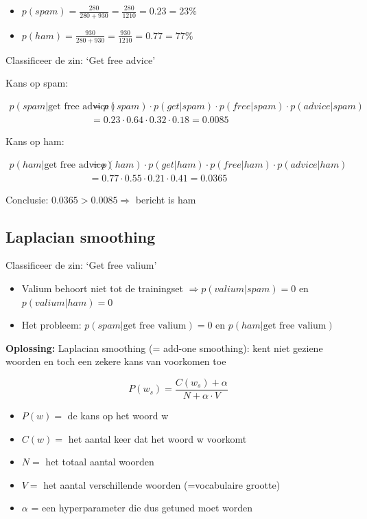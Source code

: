 \documentclass{article}
\begin{document}
\begin{itemize}
    \item $p(spam) = \frac{280}{280 + 930} = \frac{280}{1210} = 0.23 = 23\%$
    \item $p(ham) = \frac{930}{280 + 930} = \frac{930}{1210} = 0.77 = 77\%$
\end{itemize}

Classificeer de zin: `Get free advice'

Kans op spam:

\begin{align*}
    p(spam | \text{get free advice}) & = p(spam) \cdot p(get|spam) \cdot p(free|spam) \cdot p(advice | spam)\\
    & = 0.23 \cdot 0.64 \cdot 0.32 \cdot 0.18 = 0.0085
\end{align*}

Kans op ham:

\begin{align*}
    p(ham | \text{get free advice}) & = p(ham) \cdot p(get|ham) \cdot p(free|ham) \cdot p(advice | ham)\\
    & = 0.77 \cdot 0.55 \cdot 0.21 \cdot 0.41 = 0.0365
\end{align*}

Conclusie: $0.0365 > 0.0085 \Rightarrow$ bericht is ham

\subsection{Laplacian smoothing}

Classificeer de zin: `Get free valium'

\begin{itemize}
    \item Valium behoort niet tot de trainingset $\Rightarrow p(valium | spam) = 0$ en $p(valium | ham) = 0$
    \item Het probleem: $p(spam | \text{get free valium}) = 0$ en $p(ham | \text{get free valium})$
\end{itemize}

\textbf{Oplossing:} Laplacian smoothing (= add-one smoothing): kent niet geziene woorden en toch een zekere kans van voorkomen toe

\begin{equation}
    P(w_s) = \frac{C(w_s) + \alpha}{N + \alpha \cdot V}
\end{equation}

\begin{itemize}
    \item $P(w) =$ de kans op het woord w
    \item $C(w) =$ het aantal keer dat het woord w voorkomt
    \item $N =$ het totaal aantal woorden
    \item $V =$ het aantal verschillende woorden (=vocabulaire grootte)
    \item $\alpha$ = een hyperparameter die dus getuned moet worden
\end{itemize}
\end{document}
